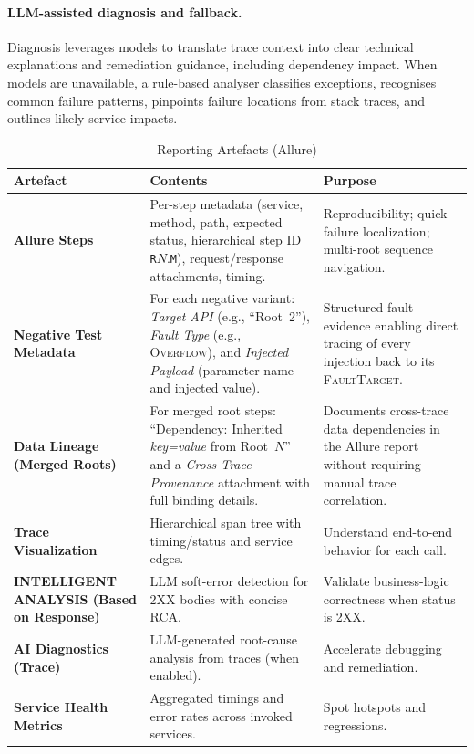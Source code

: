 \documentclass[conference]{IEEEtran}
\begin{document}
\paragraph{LLM-assisted diagnosis and fallback.}
Diagnosis leverages models to translate trace context into clear technical explanations and remediation guidance, including dependency impact. When models are unavailable, a rule-based analyser classifies exceptions, recognises common failure patterns, pinpoints failure locations from stack traces, and outlines likely service impacts.

\begin{table}[t]
\centering
\caption{Reporting Artefacts (Allure)}
\label{tab:reporting-artefacts}
\renewcommand{\arraystretch}{1.15}\setlength{\tabcolsep}{6pt}
\begin{tabularx}{\textwidth}{>{\bfseries}p{} X p{}}
\toprule
Artefact & Contents & Purpose \\
\midrule
Allure Steps & Per-step metadata (service, method, path, expected status, hierarchical step ID \texttt{R}$N$.\texttt{M}), request/response attachments, timing. & Reproducibility; quick failure localization; multi-root sequence navigation. \\
Negative Test Metadata & For each negative variant: \textit{Target API} (e.g., ``Root~2''), \textit{Fault Type} (e.g., \textsc{Overflow}), and \textit{Injected Payload} (parameter name and injected value). & Structured fault evidence enabling direct tracing of every injection back to its \textsc{FaultTarget}. \\
Data Lineage (Merged Roots) & For merged root steps: ``Dependency: Inherited \textit{key=value} from Root~$N$'' and a \textit{Cross-Trace Provenance} attachment with full binding details. & Documents cross-trace data dependencies in the Allure report without requiring manual trace correlation. \\
Trace Visualization & Hierarchical span tree with timing/status and service edges. & Understand end-to-end behavior for each call. \\
INTELLIGENT ANALYSIS (Based on Response) & LLM soft-error detection for 2XX bodies with concise RCA. & Validate business-logic correctness when status is 2XX. \\
AI Diagnostics (Trace) & LLM-generated root-cause analysis from traces (when enabled). & Accelerate debugging and remediation. \\
Service Health Metrics & Aggregated timings and error rates across invoked services. & Spot hotspots and regressions. \\
\bottomrule
\end{tabularx}
\end{table}
\end{document}
